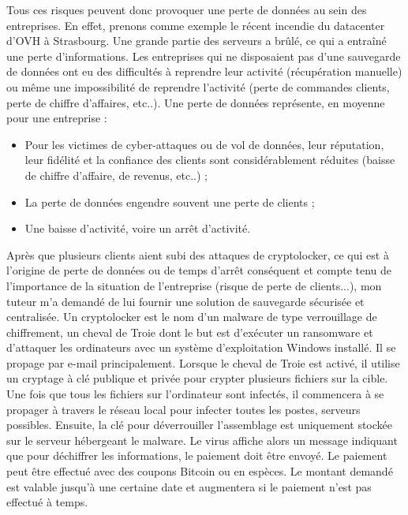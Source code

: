 \documentclass[pfe]{tnreport} %
\begin{document}
Tous ces risques peuvent donc provoquer une perte de données au sein des entreprises. \newline
En effet, prenons comme exemple le récent incendie du datacenter d'OVH à Strasbourg. Une grande partie des serveurs a brûlé, ce qui a entraîné une perte d'informations. Les entreprises qui ne disposaient pas d'une sauvegarde de données ont eu des difficultés à reprendre leur activité (récupération manuelle) ou même une impossibilité de reprendre l'activité (perte de commandes clients, perte de chiffre d'affaires, etc..). \newpage 
Une perte de données représente, en moyenne pour une entreprise : \newline
\begin{itemize}
 \item Pour les victimes de cyber-attaques ou de vol de données, leur réputation, leur fidélité et la confiance des clients sont considérablement réduites (baisse de chiffre d'affaire, de revenus, etc..) ;
 \item La perte de données engendre souvent une perte de clients ;
 \item Une baisse d'activité, voire un arrêt d'activité.\newline
\end{itemize} 
Après que plusieurs clients aient subi des attaques de cryptolocker, ce qui est à l'origine de perte de données ou de temps d'arrêt conséquent et compte tenu de l'importance de la situation de l'entreprise (risque de perte de clients...), mon tuteur m'a demandé de lui fournir une solution de sauvegarde sécurisée et centralisée. \newline
Un cryptolocker est le nom d'un malware de type verrouillage de chiffrement, un cheval de Troie dont le but est d'exécuter un ransomware et d'attaquer les ordinateurs avec un système d'exploitation Windows installé. \newline
Il se propage par e-mail principalement. Lorsque le cheval de Troie est activé, il utilise un cryptage à clé publique et privée pour crypter plusieurs fichiers sur la cible. \newline
Une fois que tous les fichiers sur l'ordinateur sont infectés, il commencera à se propager à travers le réseau local pour infecter toutes les postes, serveurs possibles. Ensuite, la clé pour déverrouiller l'assemblage est uniquement stockée sur le serveur hébergeant le malware. \newline
Le virus affiche alors un message indiquant que pour déchiffrer les informations, le paiement doit être envoyé. \newline
Le paiement peut être effectué avec des coupons Bitcoin ou en espèces. Le montant demandé est valable jusqu'à une certaine date et augmentera si le paiement n'est pas effectué à temps. \newline
\end{document}
